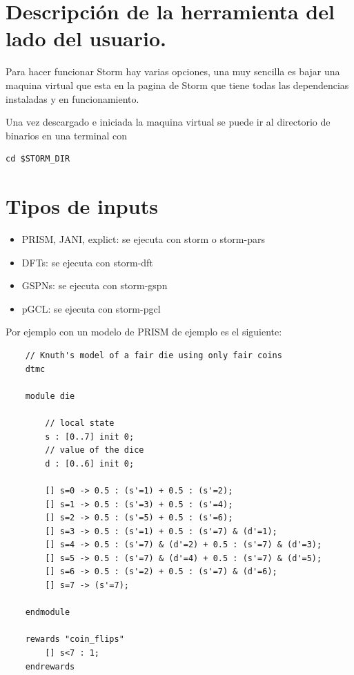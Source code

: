\documentclass[11pt]{article}
\begin{document}
\section{Descripci\'on de la herramienta del lado del usuario.}

Para hacer funcionar Storm hay varias opciones, una muy sencilla es bajar una maquina virtual que esta en la pagina de Storm que tiene todas las dependencias instaladas y en funcionamiento.

Una vez descargado e iniciada la maquina virtual se puede ir al directorio de binarios en una terminal con

\begin{verbatim}
cd $STORM_DIR
\end{verbatim}

\section{Tipos de inputs}
\begin{itemize}
	\item PRISM, JANI, explict: se ejecuta con storm o storm-pars
	
	\item DFTs: se ejecuta con storm-dft

	\item GSPNs: se ejecuta con storm-gspn

	\item pGCL: se ejecuta con storm-pgcl
\end{itemize} 

Por ejemplo con un modelo de PRISM de ejemplo es el siguiente:

\begin{verbatim}
	// Knuth's model of a fair die using only fair coins
	dtmc
	
	module die
	
		// local state
		s : [0..7] init 0;
		// value of the dice
		d : [0..6] init 0;
		
		[] s=0 -> 0.5 : (s'=1) + 0.5 : (s'=2);
		[] s=1 -> 0.5 : (s'=3) + 0.5 : (s'=4);
		[] s=2 -> 0.5 : (s'=5) + 0.5 : (s'=6);
		[] s=3 -> 0.5 : (s'=1) + 0.5 : (s'=7) & (d'=1);
		[] s=4 -> 0.5 : (s'=7) & (d'=2) + 0.5 : (s'=7) & (d'=3);
		[] s=5 -> 0.5 : (s'=7) & (d'=4) + 0.5 : (s'=7) & (d'=5);
		[] s=6 -> 0.5 : (s'=2) + 0.5 : (s'=7) & (d'=6);
		[] s=7 -> (s'=7);
		
	endmodule
	
	rewards "coin_flips"
		[] s<7 : 1;
	endrewards
\end{verbatim}
\end{document}
